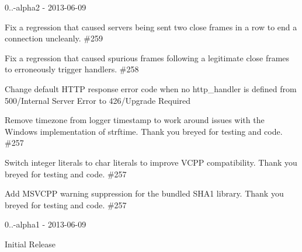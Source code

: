 0..-\/alpha2 -\/ 2013-\/06-\/09
\begin{DoxyItemize}
\item Fix a regression that caused servers being sent two close frames in a row to end a connection uncleanly. \#259
\item Fix a regression that caused spurious frames following a legitimate close frames to erroneously trigger handlers. \#258
\item Change default HTTP response error code when no http\+\_\+handler is defined from 500/\+Internal Server Error to 426/\+Upgrade Required
\item Remove timezone from logger timestamp to work around issues with the Windows implementation of strftime. Thank you breyed for testing and code. \#257
\item Switch integer literals to char literals to improve VCPP compatibility. Thank you breyed for testing and code. \#257
\item Add MSVCPP warning suppression for the bundled SHA1 library. Thank you breyed for testing and code. \#257
\end{DoxyItemize}

0..-\/alpha1 -\/ 2013-\/06-\/09
\begin{DoxyItemize}
\item Initial Release 
\end{DoxyItemize}